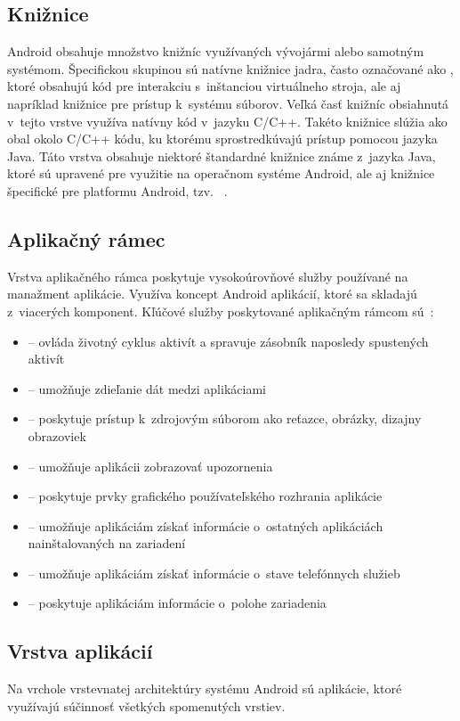 \subsection{Knižnice}
Android obsahuje množstvo knižníc využívaných vývojármi alebo samotným systémom. Špecifickou skupinou sú natívne knižnice jadra, často označované ako , ktoré obsahujú kód pre interakciu s~inštanciou virtuálneho stroja, ale aj napríklad knižnice pre prístup k~systému súborov. Veľká časť knižníc obsiahnutá v~tejto vrstve využíva natívny kód v~jazyku C/C++. Takéto knižnice slúžia ako obal okolo C/C++ kódu, ku ktorému  sprostredkúvajú prístup pomocou jazyka Java. Táto vrstva obsahuje niektoré štandardné knižnice známe z~jazyka Java, ktoré sú upravené pre využitie na operačnom systéme Android, ale aj knižnice špecifické pre platformu Android, tzv. ~\cite{Hashimi2009}.
\subsection{Aplikačný rámec}
Vrstva aplikačného rámca poskytuje vysokoúrovňové služby používané na manažment aplikácie. Využíva koncept Android aplikácií, ktoré sa skladajú z~viacerých komponent. Kľúčové služby poskytované aplikačným rámcom sú~\cite{architecture}: 
\begin{itemize}
	\item {}  --  ovláda životný cyklus aktivít a spravuje zásobník naposledy spustených aktivít
	\item {}  --  umožňuje zdieľanie dát medzi aplikáciami
	\item {}  --  poskytuje prístup k~zdrojovým súborom ako reťazce, obrázky, dizajny obrazoviek
	\item {}  --  umožňuje aplikácii zobrazovať upozornenia
	\item {}  --  poskytuje prvky grafického používateľského rozhrania aplikácie
	\item {}  --  umožňuje aplikáciám získať informácie o~ostatných aplikáciách nainštalovaných na zariadení
	\item {}  --  umožňuje aplikáciám získať informácie o~stave telefónnych služieb
	\item {}  --  poskytuje aplikáciám informácie o~polohe zariadenia
\end{itemize}
\subsection{Vrstva aplikácií}
Na vrchole vrstevnatej architektúry systému Android sú aplikácie, ktoré využívajú súčinnosť všetkých spomenutých vrstiev. 

